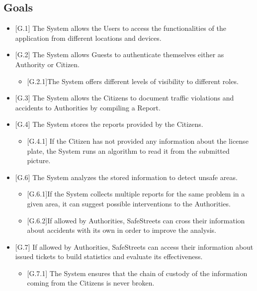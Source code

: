 \documentclass{report}
\begin{document}
\subsection{Goals}
\begin{itemize}
    \item {[G.1]} The System allows the Users to access the functionalities of the application from different locations and devices.
    \item {[G.2]} The System allows Guests to authenticate themselves either as Authority or Citizen.
    \begin{itemize}
    		\item {[G.2.1]}The System offers different levels of visibility to different roles.
    \end{itemize}
    \item {[G.3]} The System allows the Citizens to document traffic violations and accidents to Authorities by compiling a Report.
    \item {[G.4]} The System stores the reports provided by the Citizens.
    \begin{itemize}
    		\item {[G.4.1]} If the Citizen has not provided any information about the license plate, the System runs an algorithm to read it from the submitted picture.
    	\end{itemize}     
    \item {[G.6]} The System analyzes the stored information to detect unsafe areas.
    \begin{itemize}
    		\item {[G.6.1]}If the System collects multiple reports for the same problem in a given area, it can suggest possible interventions to the Authorities.
    		\item {[G.6.2]}If allowed by Authorities, SafeStreets can cross their information about accidents with its own in order to improve the analysis.
    \end{itemize}    
    \item{[G.7]} If allowed by Authorities, SafeStreets can access their information about issued tickets to build statistics and evaluate its effectiveness.
    \begin{itemize}
        \item {[G.7.1]} The System ensures that the chain of custody of the information coming from the Citizens is never broken.
    \end{itemize}
\end{itemize}
\end{document}
